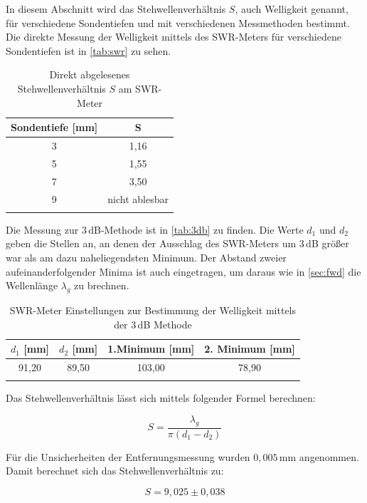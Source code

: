 In diesem Abschnitt wird das Stehwellenverhältnis $S$, auch Welligkeit genannt, für verschiedene Sondentiefen und mit verschiedenen Messmethoden bestimmt.
Die direkte Messung der Welligkeit mittels des SWR-Meters für verschiedene Sondentiefen ist in \autoref{tab:swr} zu sehen.


\begin{table}
\centering
\caption{Direkt abgelesenes Stehwellenverhältnis $S$ am SWR-Meter}
\begin{tabular}{c c}
\toprule
{Sondentiefe [mm]} & {S}\\
\midrule
3&1,16\\
5&1,55\\
7&3,50\\
9&nicht ablesbar\\
\bottomrule
\label{tab:swr}
\end{tabular}
\end{table}


Die Messung zur 3\,dB-Methode ist in \autoref{tab:3db} zu finden. Die Werte $d_1$ und $d_2$ geben die Stellen an, an denen der Ausschlag des SWR-Meters um 3\,dB größer war als am dazu naheliegendsten Minimum. Der Abstand zweier aufeinanderfolgender Minima ist auch eingetragen, um daraus wie in \autoref{sec:fwd} die Wellenlänge $\lambda_g$ zu brechnen.



\begin{table}
\centering
\caption{SWR-Meter Einstellungen zur Bestimmung der Welligkeit mittels der 3\,dB Methode}
\begin{tabular}{c c c c}
\toprule
{$d_1$ [mm]} & {$d_2$ [mm]}& {1.Minimum [mm]}& {2. Minimum [mm]}\\
\midrule
91,20 & 89,50 & 103,00 & 78,90\\
\bottomrule
\label{tab:3db}
\end{tabular}
\end{table}

Das Stehwellenverhältnis lässt sich mittels folgender Formel berechnen:

\begin{equation}
S = \frac{\lambda_g}{\pi (d_1 - d_2)}
\label{eq:welligkeit1}
\end{equation}

Für die Unsicherheiten der Entfernungsmessung wurden $0,005$\,mm angenommen. Damit berechnet sich das Stehwellenverhältnis zu:

\begin{equation}
S = 9,025 \pm 0,038
\label{eq:welligkeit2}
\end{equation}

